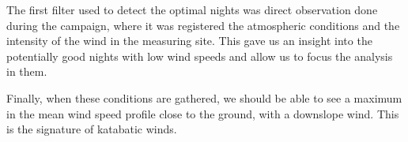 The first filter used to detect the optimal nights was direct observation done during the campaign, where it was registered the atmospheric conditions and the intensity of the wind in the measuring site. This gave us an insight into the potentially good nights with low wind speeds and allow us to focus the analysis in them.

Finally, when these conditions are gathered, we should be able to see a maximum in the mean wind speed profile close to the ground, with a downslope wind. This is the signature of katabatic winds.